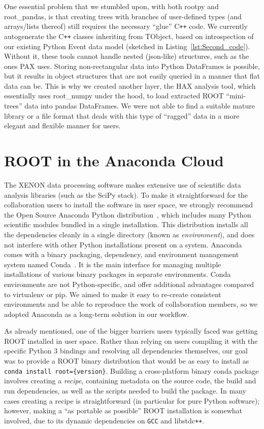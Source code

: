\documentclass[a4paper]{jpconf}
\begin{document}
One essential problem that we stumbled upon, with both rootpy and root\_pandas, is that creating trees with branches 
of user-defined types (and arrays/lists thereof) still requires the necessary ``glue''  C\texttt{++} code. 
We currently autogenerate the C\texttt{++} classes inheriting from TObject, based on introspection of our existing Python Event data model (sketched in Listing~\ref{lst:Second_code}).
Without it, these tools cannot handle nested (json-like) structures, such as the ones PAX uses.
Storing non-rectangular data into Python DataFrames is possible, but it results in object structures that are not easily queried in a manner that flat data 
can be. This is why we created another layer, the HAX analysis tool, which essentially uses root\_numpy under the hood, to load extracted ROOT ``mini-trees'' data into pandas DataFrames.
We were not able to find a suitable mature library or a file format that deals with this type of ``ragged'' data in a more elegant and flexible manner for users.


\section{ROOT in the Anaconda Cloud}
\label{sec:ROOT_Anaconda}

The XENON data processing software makes extensive use of scientific data analysis libraries (such as the SciPy stack).
To make it straightforward for the collaboration users to install the software in user space,
we strongly recommend the Open Source Anaconda Python distribution~\cite{Anaconda_distribution}, which includes many Python scientific modules
bundled in a single installation. This distribution installs all the dependencies cleanly in a single directory (known as \textit{environment}),
and does not interfere with other Python installations present on a system. 
Anaconda comes with a binary packaging, dependency, and environment management system named Conda~\cite{conda}.
It is the main interface for managing multiple installations of various binary packages in separate environments.
Conda environments are not Python-specific, and offer additional advantages compared to virtualenv or pip. 
We aimed to make it easy to re-create consistent environments and be able to reproduce the work of collaboration members, so we adopted Anaconda as a long-term solution in our workflow.

As already mentioned, one of the bigger barriers users typically faced was getting ROOT installed in user space. Rather 
than relying on users compiling it with the specific Python 3 bindings and resolving all dependencies themselves,
our goal was to provide a ROOT binary distribution that would be as easy to install as \texttt{conda install root=\{version\}}.
Building a cross-platform binary conda package involves creating a \textit{recipe}, containing metadata on the source code, the build and run dependencies, as well as the scripts 
needed to build the package. In many cases creating a recipe is straightforward (in particular for pure Python software); however, making a ``as portable as possible'' ROOT installation is somewhat involved,
due to its dynamic dependencies on \texttt{GCC} and libstdc\texttt{++}.
\end{document}
